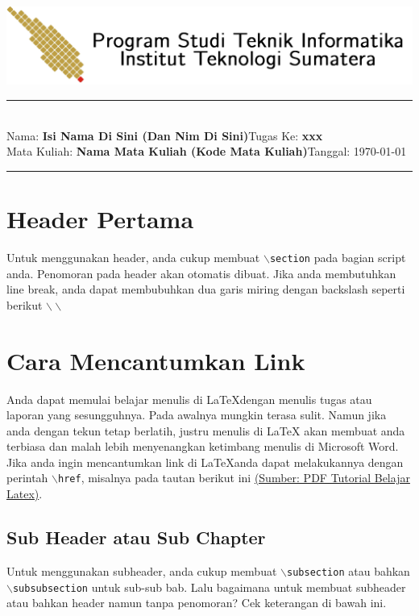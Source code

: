 \documentclass[11pt,a4paper]{article}
\newcommand{\student}{\textbf{Isi Nama Di Sini (Dan Nim Di Sini)}}
\newcommand{\course}{\textbf{Nama Mata Kuliah (Kode Mata Kuliah)}}
\newcommand{\assignment}{\textbf{xxx}}
\begin{document}
\thispagestyle{empty}
\begin{center}
	\includegraphics[scale = 0.15]{Figure/ifitera-header.png}
	\vspace{0.1cm}
\end{center}
\noindent
\rule{17cm}{0.2cm}\\[0.3cm]
Nama: \student \hfill Tugas Ke: \assignment\\[0.1cm]
Mata Kuliah: \course \hfill Tanggal: \today\\
\rule{17cm}{0.05cm}
\vspace{0.1cm}



\section{Header Pertama}
    Untuk menggunakan header, anda cukup membuat $\backslash${\tt{section}} pada bagian script anda. Penomoran pada header akan otomatis dibuat. Jika anda membutuhkan line break, anda dapat membubuhkan dua garis miring dengan backslash seperti berikut $\backslash\backslash$

\section{Cara Mencantumkan Link}
    Anda dapat memulai belajar menulis di \LaTeX dengan menulis tugas atau laporan yang sesungguhnya. Pada awalnya mungkin terasa sulit. Namun jika anda dengan tekun tetap berlatih, justru menulis di LaTeX akan membuat anda terbiasa dan malah lebih menyenangkan ketimbang menulis di Microsoft Word.\\
    Jika anda ingin mencantumkan link di \LaTeX anda dapat melakukannya dengan perintah $\backslash${\tt{href}}, misalnya pada tautan berikut ini \href{http://aldi_tob_2000.staff.gunadarma.ac.id/Downloads/files/17359/Membuat+dokumen+dengan+latex.pdf}{(Sumber: PDF Tutorial Belajar Latex)}.
    
\subsection{Sub Header atau Sub Chapter}
     Untuk menggunakan subheader, anda cukup membuat $\backslash${\tt{subsection}} atau bahkan  $\backslash${\tt{subsubsection}} untuk sub-sub bab. Lalu bagaimana untuk membuat subheader atau bahkan header namun tanpa penomoran? Cek keterangan di bawah ini.
\end{document}
